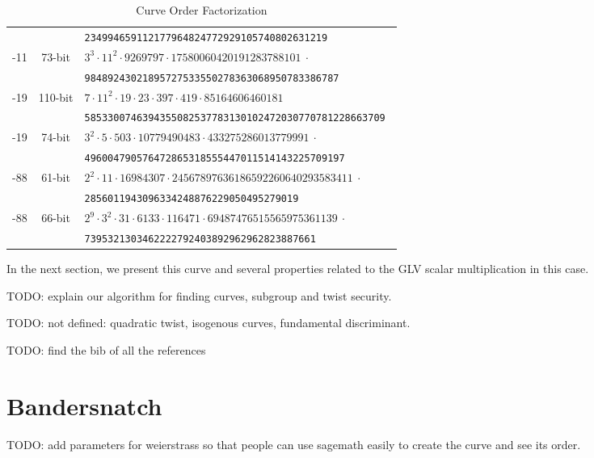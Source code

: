 \documentclass{amsart}
\newcommand{\SM}[1]{\color{blue}#1\color{black}}
\begin{document}
\begin{table*}[ht]
\begin{tabularx}{\textwidth}{ccl}
         			&   & \tt  234994659112177964824772929105740802631219  \\    			
        -11  &  73-bit & \tt $3^3 \cdot 11^2 \cdot 9269797 \cdot 17580060420191283788101 ~\cdot$  \\
         			&   & \tt  98489243021895727533550278363068950783386787  \\   
        -19  &  110-bit & \tt $ 7 \cdot11^2  \cdot 19  \cdot 23  \cdot 397  \cdot 419 \cdot 85164606460181$  \\
         			&   & \tt 5853300746394355082537783130102472030770781228663709  \\   
        -19  &  74-bit & \tt $ 3^2 \cdot 5 \cdot 503 \cdot 10779490483 \cdot 433275286013779991 ~\cdot$  \\
         			&   & \tt 496004790576472865318555447011514143225709197 \\   
        -88  &  61-bit & \tt $ 2^2 \cdot 11 \cdot 16984307 \cdot 24567897636186592260640293583411~\cdot$  \\
         			&   & \tt 2856011943096334248876229050495279019 \\   
        -88  &  66-bit & \tt $ 2^9 \cdot 3^2 \cdot 31 \cdot 6133 \cdot 116471 \cdot 69487476515565975361139~\cdot$  \\
         			&   & \tt 7395321303462222792403892962962823887661 \\   
        \bottomrule
    \end{tabularx}
    \caption{Curve Order Factorization}
    \label{tab:group-order-factorization}
\end{table*}

In the next section, we present this curve and several properties
related to the  GLV scalar multiplication in this case.

\SM{TODO: explain our algorithm for finding curves, subgroup and twist
  security.}

\SM{TODO: not defined: quadratic twist, isogenous curves, fundamental
  discriminant.}

\SM{TODO: find the bib of all the references}

\section{Bandersnatch} 

\SM{TODO: add parameters for weierstrass so that people can use sagemath
  easily to create the curve and see its order.}
\end{document}
